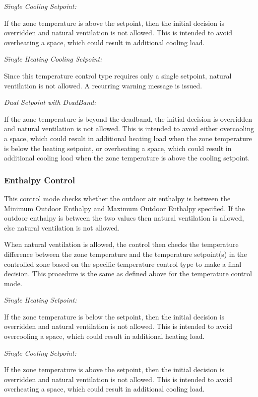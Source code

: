 \emph{Single Cooling Setpoint:}

If the zone temperature is above the setpoint, then the initial decision is overridden and natural ventilation is not allowed. This is intended to avoid overheating a space, which could result in additional cooling load.

\emph{Single Heating Cooling Setpoint:}

Since this temperature control type requires only a single setpoint, natural ventilation is not allowed. A recurring warning message is issued.

\emph{Dual Setpoint with DeadBand:}

If the zone temperature is beyond the deadband, the initial decision is overridden and natural ventilation is not allowed. This is intended to avoid either overcooling a space, which could result in additional heating load when the zone temperature is below the heating setpoint, or overheating a space, which could result in additional cooling load when the zone temperature is above the cooling setpoint.

\subsubsection{Enthalpy Control}\label{enthalpy-control}

This control mode checks whether the outdoor air enthalpy is between the Minimum Outdoor Enthalpy and Maximum Outdoor Enthalpy specified. If the outdoor enthalpy is between the two values then natural ventilation is allowed, else natural ventilation is not allowed.

When natural ventilation is allowed, the control then checks the temperature difference between the zone temperature and the temperature setpoint(s) in the controlled zone based on the specific temperature control type to make a final decision. This procedure is the same as defined above for the temperature control mode.

\emph{Single Heating Setpoint:}

If the zone temperature is below the setpoint, then the initial decision is overridden and natural ventilation is not allowed. This is intended to avoid overcooling a space, which could result in additional heating load.

\emph{Single Cooling Setpoint:}

If the zone temperature is above the setpoint, then the initial decision is overridden and natural ventilation is not allowed. This is intended to avoid overheating a space, which could result in additional cooling load.

